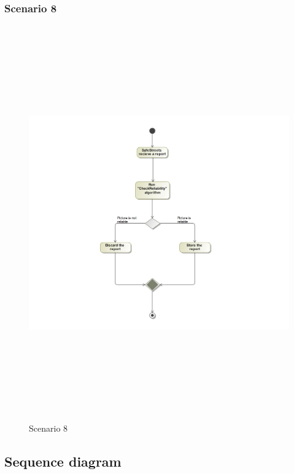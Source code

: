 \subsubsection{Scenario 8}
\begin{figure}[H]
	\begin{minipage}[b]{0.40\textwidth}
		\includegraphics[width=14cm,height=17cm]{Images/ActivityRASD/Scenario8.png}
		\caption{Scenario 8}
	\end{minipage}
\end{figure}

\newpage
\subsection{Sequence diagram}
